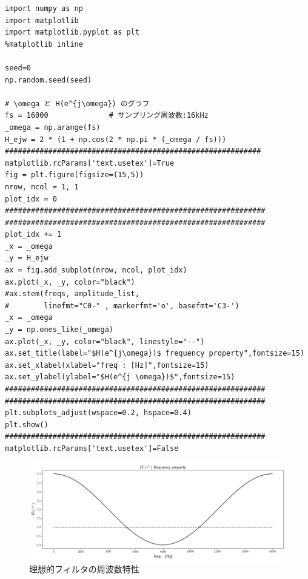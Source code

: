 \documentclass[12pt]{jsarticle}
\begin{document}
        \begin{lstlisting}[basicstyle=\ttfamily\footnotesize, frame=single]
import numpy as np
import matplotlib
import matplotlib.pyplot as plt
%matplotlib inline

seed=0
np.random.seed(seed)

# \omega と H(e^{j\omega}) のグラフ
fs = 16000              # サンプリング周波数:16kHz
_omega = np.arange(fs)
H_ejw = 2 * (1 + np.cos(2 * np.pi * (_omega / fs)))
###########################################################
matplotlib.rcParams['text.usetex']=True
fig = plt.figure(figsize=(15,5))
nrow, ncol = 1, 1
plot_idx = 0
############################################################
############################################################
plot_idx += 1
_x = _omega
_y = H_ejw
ax = fig.add_subplot(nrow, ncol, plot_idx)
ax.plot(_x, _y, color="black")
#ax.stem(freqs, amplitude_list,
#        linefmt="C0-" , markerfmt='o', basefmt='C3-')
_x = _omega
_y = np.ones_like(_omega)
ax.plot(_x, _y, color="black", linestyle="--")
ax.set_title(label="$H(e^{j\omega})$ frequency property",fontsize=15)
ax.set_xlabel(xlabel="freq : [Hz]",fontsize=15)
ax.set_ylabel(ylabel="$H(e^{j \omega})$",fontsize=15)
############################################################
############################################################
plt.subplots_adjust(wspace=0.2, hspace=0.4)
plt.show()
############################################################
matplotlib.rcParams['text.usetex']=False
				\end{lstlisting}
				
    		\begin{figure}[H]
    			\begin{center}
    				\includegraphics[width=1.0\columnwidth]{img/frequency_property_of_an_ideal_filter.png}
    				\caption{理想的フィルタの周波数特性}
    				\label{img-frequency_property_of_an_ideal_filter}
    			\end{center}
    		\end{figure}
    		
\end{document}
